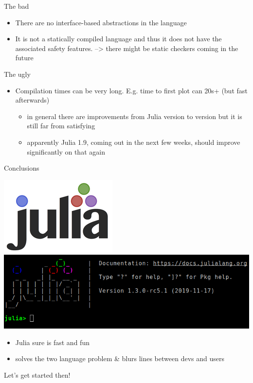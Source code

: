 \documentclass[compress,presentation,aspectratio=169]{beamer}
\begin{document}



\begin{frame}[label={sec:org87110ce}]{The bad}
  \footnotesize
\begin{itemize}
\item There are no interface-based abstractions in the language
\item It is not a statically compiled language and thus it does not have
the associated safety features.
--> there might be static checkers coming in the future
\end{itemize}
\end{frame}

\begin{frame}[label={sec:orgd4030d7}]{The ugly}
  \footnotesize
\begin{itemize}
\item \large Compilation times can be very long.  E.g. time to first plot can
20s+ (but fast afterwards)
\begin{itemize}
\item in general there are improvements from Julia version to version
  but it is still far from satisfying
\item apparently Julia 1.9, coming out in the next few weeks, should
  improve significantly on that again
\end{itemize}
\end{itemize}
\end{frame}



\begin{frame}[label={sec:orge9a7aab}]{Conclusions}
  \begin{center}
\includegraphics[width=.2\linewidth]{./figs/julia-logo.png}\quad \includegraphics[width=.3\linewidth]{./figs/julia-repl.png}
\end{center}

  \footnotesize
\begin{itemize}
\item Julia sure is fast and fun
\item solves the two language problem \& blurs lines between devs and users
\end{itemize}
\vspace{5mm}
\pause

Let's get started then!

\end{frame}
\end{document}
